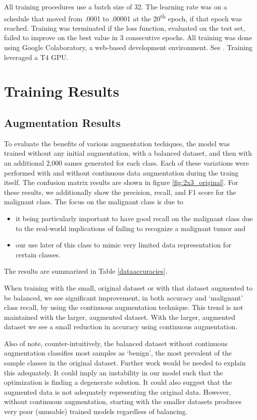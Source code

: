 \documentclass[sn-mathphys,Numbered]{sn-jnl}%
\theoremstyle{thmstyleone}%
\theoremstyle{thmstyletwo}%
\theoremstyle{thmstylethree}%
\begin{document}
All training procedures use a batch size of 32.  The learning rate was on a schedule that moved from .0001 to .00001 at the 20\textsuperscript{th} epoch, if that epoch was reached.  Training was terminated if the loss function, evaluated on the test set, failed to improve on the best value in 3 consecutive epochs.  All training was done using Google Colaboratory, a web-based development environment.  See \cite{colab}.  Training leveraged a T4 GPU.

\section{Training Results}\label{sectraining}
\subsection{Augmentation Results}\label{sectraining_augmentation}
To evaluate the benefits of various augmentation techiques, the model was trained without any initial augmentation, with a balanced dataset, and then with an additional 2,000 sames generated for each class.  Each of these variations were performed with and without continuous data augmentation during the traing itself.  The confusion matrix results are shown in figure \ref{fig:2x3_original}.   For these results, we additionally show the precision, recall, and F1 score for the malignant class.  The focus on the malignant class is due to
\begin{itemize}
\item it being particularly important to have good recall on the malignant class due to the real-world implications of failing to recognize a malignant tumor and
\item our use later of this class to mimic very limited data representation for certain classes.
\end{itemize}
The results are summarized in Table \ref{dataaccuracies}.

When training with the small, original dataset or with that dataset augmented to be balanced, we see significant improvement, in both accuracy and `malignant' class recall, by using the continuous augmentation technique.  This trend is not maintained with the larger, augmented dataset.  With the larger, augmented dataset we see a small reduction in accuracy using continuous augmentation.   

Also of note, counter-intuitively, the balanced dataset without continuous augmentation classifies most samples as `benign', the most prevalent of the sample classes in the original dataset.  Further work would be needed to explain this adequately.  It could imply an instability in our model such that the optimization is finding a degenerate solution.  It could also suggest that the augmented data is not adequately representing the original data.  However, without continuous augmentation, starting with the smaller datasets produces very poor (unusable) trained models regardless of balancing.
\end{document}
